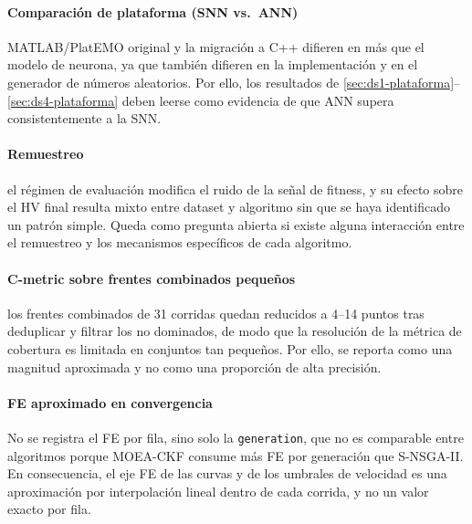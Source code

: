 \paragraph{Comparación de plataforma (SNN vs.\ ANN)} MATLAB/PlatEMO original y la migración a C++ difieren en más que el modelo de neurona, ya que también difieren en la implementación y en el generador de números aleatorios. Por ello, los resultados de \ref{sec:ds1-plataforma}--\ref{sec:ds4-plataforma} deben leerse como evidencia de que ANN supera consistentemente a la SNN.

\paragraph{Remuestreo} el régimen de evaluación modifica el ruido de la señal de fitness, y su efecto sobre el HV final resulta mixto entre dataset y algoritmo sin que se haya identificado un patrón simple. Queda como pregunta abierta si existe alguna interacción entre el remuestreo y los mecanismos específicos de cada algoritmo.

\paragraph{C-metric sobre frentes combinados pequeños} los frentes combinados de 31 corridas quedan reducidos a 4--14 puntos tras deduplicar y filtrar los no dominados, de modo que la resolución de la métrica de cobertura es limitada en conjuntos tan pequeños. Por ello, se reporta como una magnitud aproximada y no como una proporción de alta precisión.

\paragraph{FE aproximado en convergencia} No se registra el FE por fila, sino solo la \texttt{generation}, que no es comparable entre algoritmos porque MOEA-CKF consume más FE por generación que S-NSGA-II. En consecuencia, el eje FE de las curvas y de los umbrales de velocidad es una aproximación por interpolación lineal dentro de cada corrida, y no un valor exacto por fila.

